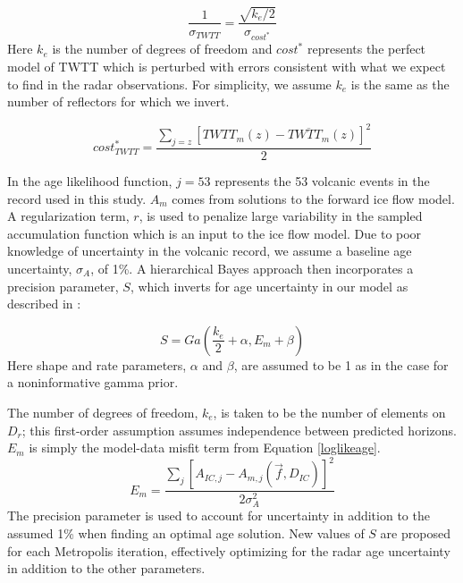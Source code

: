 \begin{equation}
\frac{1}{\sigma_{TWTT}}= \frac{\sqrt{k_e/2}}{\sigma_{cost^*}}
\end{equation}
Here $k_e$ is the number of degrees of freedom and $cost^*$ represents the perfect model of TWTT which is perturbed with errors consistent with what we expect to find in the radar observations. For simplicity, we assume $k_e$ is the same as the number of reflectors for which we invert.

\begin{equation}
cost^*_{TWTT} = \frac{\sum_{j = z}[TWTT_m(z) - \overline{TWTT_m}(z)]^2}{2}
\end{equation}

In the age likelihood function, $j=53$ represents the 53 volcanic events in the record used in this study. $A_m$ comes from solutions to the forward ice flow model. A regularization term, $r$, is used to penalize large variability in the sampled accumulation function which is an input to the ice flow model. Due to poor knowledge of uncertainty in the volcanic record, we assume a baseline age uncertainty, $\sigma_A$, of 1\%.  A hierarchical Bayes approach then incorporates a precision parameter, $S$, which inverts for age uncertainty in our model as described in \citet{jackson&huerta2016}:

\begin{equation}
S = Ga(\frac{k_e}{2}+\alpha, E_m+\beta)
\end{equation}
Here shape and rate parameters, $\alpha$ and $\beta$, are assumed to be 1 as in the case for a noninformative gamma prior. 

The number of degrees of freedom, $k_e$, is taken to be the number of elements on $D_r$; this first-order assumption assumes independence between predicted horizons. $E_m$ is simply the model-data misfit term from Equation \ref{loglikeage}.
\begin{equation}
 E_m= \frac{\sum_{j}[A_{IC,j} - A_{m,j}(\vec{f},D_{IC})]^2}{2\sigma_A^2} 
\end{equation}
The precision parameter is used to account for uncertainty in addition to the assumed 1\% when finding an optimal age solution. New values of $S$ are proposed for each Metropolis iteration, effectively optimizing for the radar age uncertainty in addition to the other parameters.



